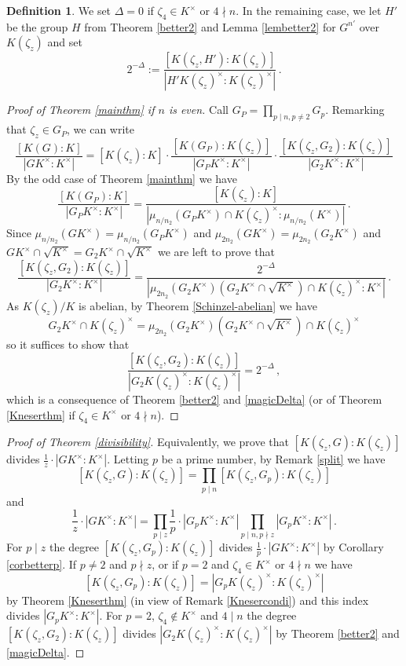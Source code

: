 \documentclass[11pt, a4paper]{amsart}
\theoremstyle{definition}
\newtheorem {defi}[thm]{Definition}
\begin{document}
\begin{defi}\label{Delta}
We set $\Delta=0$ if $\zeta_4\in K^\times$ or $4\nmid n$. In the remaining case, we let 
$H'$ be the group $H$ from Theorem \ref{better2} and Lemma \ref{lembetter2} for $G^{n'}$ over $K(\zeta_z)$ and set 
\begin{equation}\label{magicDelta}
2^{-\Delta}:=\frac{[K(\zeta_z, H'):K(\zeta_z)]}{|H'K(\zeta_z)^\times:K(\zeta_z)^\times|}\,.
\end{equation}
\end{defi}

\begin{proof}[Proof of Theorem \ref{mainthm} if $n$ is even]
Call $G_{P}=\prod_{p\mid n, p\neq 2} G_p$. Remarking that $\zeta_z\in G_P$, we can write     $$\frac{[K(G):K]}{|GK^\times:K^\times|}=[K(\zeta_z):K]\cdot 
\frac{[K(G_{P}):K(\zeta_z)]}{|G_{P}K^\times:K^\times|} \cdot
    \frac{[K(\zeta_z,G_2):K(\zeta_z)]}{|G_2 K^\times:K^\times|}
    $$
By the odd case of Theorem \ref{mainthm} we have
$$\frac{[K(G_{P}):K]}{|G_{P}K^\times:K^\times|}=\frac{[K(\zeta_z):K]}{|\mu_{n/n_2}(G_P K^\times)\cap K(\zeta_{z})^\times: \mu_{n/n_2}( K^\times)|}\,.$$
Since $\mu_{n/n_2}(G K^\times)=\mu_{n/n_2}(G_P K^\times)$ and $\mu_{2n_2}(G K^\times)=\mu_{2n_2}(G_2 K^\times)$ and $GK^\times \cap \sqrt{K^\times}=G_2K^\times \cap \sqrt{K^\times}$ we are left to prove that
$$\frac{[K(\zeta_z,G_2):K(\zeta_z)]}{|G_2 K^\times:K^\times|}=\frac{2^{-\Delta}}{|\mu_{2n_2}(G_2 K^\times)(G_2K^\times\cap\sqrt{K^\times})\cap K(\zeta_z)^\times: K^\times|}\,.$$
As $K(\zeta_z)/K$ is abelian, by Theorem \ref{Schinzel-abelian}
we have   
$$G_2 K^\times\cap K(\zeta_z)^\times=\mu_{2n_2}(G_2 K^\times)(G_2K^\times\cap\sqrt{K^\times})\cap K(\zeta_z)^\times$$
so it suffices to show that 
$$\frac{[K(\zeta_z,G_2):K(\zeta_z)]}{|G_2 K(\zeta_z)^\times:K(\zeta_z)^\times|}=2^{-\Delta}\,,$$
which is a consequence of Theorem \ref{better2} and \eqref{magicDelta} (or of Theorem \ref{Kneserthm} if $\zeta_4\in K^\times$ or $4\nmid n$).
\end{proof}


\begin{proof}[Proof of Theorem \ref{divisibility}]
Equivalently, we prove that   
$[K(\zeta_z, G):K(\zeta_z)]$ divides 
$\frac{1}{z} \cdot |GK^{\times}:K^{\times}|$.
Letting $p$ be a prime number, by Remark \ref{split} we have 
$$[K(\zeta_z, G):K(\zeta_z)]=\prod_{p\mid n} [K(\zeta_z, G_p):K(\zeta_z)]$$
and 
$$\frac{1}{z} \cdot |GK^{\times}:K^{\times}|=\prod_{p\mid z}\frac{1}{p} \cdot |G_pK^{\times}:K^{\times}| \prod_{p\mid n, p\nmid z} |G_pK^{\times}:K^{\times}|\,.$$
For $p\mid z$ the degree 
$[K(\zeta_z, G_p):K(\zeta_z)]$ divides 
$\frac{1}{p} \cdot |GK^{\times}:K^{\times}|$ by Corollary \ref{corbetterp}. If $p\neq 2$ and  $p\nmid z$, or if $p=2$ and $\zeta_4\in K^\times$ or $4\nmid n$ we have 
$$[K(\zeta_z, G_p):K(\zeta_z)]=|G_pK(\zeta_z)^{\times}:K(\zeta_z)^{\times}|$$ by Theorem \ref{Kneserthm} (in view of Remark \ref{Knesercondi}) and this index divides $|G_pK^{\times}:K^{\times}|$. For $p=2$, $\zeta_4\notin K^\times$ and $4\mid n$ the degree $[K(\zeta_z, G_2):K(\zeta_z)]$ divides $|G_2 K(\zeta_z)^{\times}:K(\zeta_z)^{\times}|$ by Theorem \ref{better2} and \eqref{magicDelta}.
\end{proof}
\end{document}
